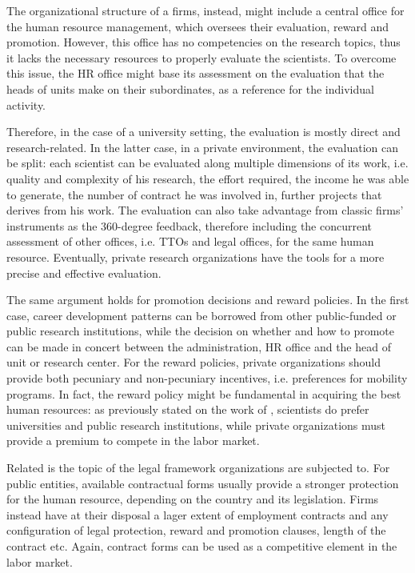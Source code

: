 The organizational structure of a firms, instead, might include a central office for the human resource management, which oversees their evaluation, reward and promotion. However, this office has no competencies on the research topics, thus it lacks the necessary resources to properly evaluate the scientists. To overcome this issue, the HR office might base its assessment on the evaluation that the heads of units make on their subordinates, as a reference for the individual activity.

Therefore, in the case of a university setting, the evaluation is mostly direct and research-related. In the latter case, in a private environment, the evaluation can be split: each scientist can be evaluated along multiple dimensions of its work, i.e. quality and complexity of his research, the effort required, the income he was able to generate, the number of contract he was involved in, further projects that derives from his work. The evaluation can also take advantage from classic firms' instruments as the 360-degree feedback, therefore including the concurrent assessment of other offices, i.e. TTOs and legal offices, for the same human resource. Eventually, private research organizations have the tools for a more precise and effective evaluation.

The same argument holds for promotion decisions and reward policies. In the first case, career development patterns can be borrowed from other public-funded or public research institutions, while the decision on whether and how to promote can be made in concert between the administration, HR office and the head of unit or research center. For the reward policies, private organizations should provide both pecuniary and non-pecuniary incentives, i.e. preferences for mobility programs. In fact, the reward policy might be fundamental in acquiring the best human resources: as previously stated on the work of \citet{Stern2004}, scientists do prefer universities and public research institutions, while private organizations must provide a premium to compete in the labor market.

Related is the topic of the legal framework organizations are subjected to. For public entities, available contractual forms usually provide a stronger protection for the human resource, depending on the country and its legislation. Firms instead have at their disposal a lager extent of employment contracts and any configuration of legal protection, reward and promotion clauses, length of the contract etc. Again, contract forms can be used as a competitive element in the labor market. 


